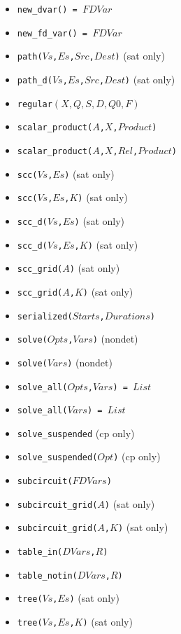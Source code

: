 \documentclass[10pt]{article}
\begin{document}
\begin{multicols}{2}
\begin{scriptsize}
\begin{itemize}
\item \texttt{new\_dvar() = $FDVar$}
\item \texttt{new\_fd\_var() = $FDVar$}
\item \texttt{path($Vs$,$Es$,$Src$,$Dest$)} (sat only)    
\item \texttt{path\_d($Vs$,$Es$,$Src$,$Dest$)} (sat only)    
\item \texttt{regular$(X,Q,S,D,Q0,F)$}
\item \texttt{scalar\_product($A$,$X$,$Product$)} 
\item \texttt{scalar\_product($A$,$X$,$Rel$,$Product$)}
\item \texttt{scc($Vs$,$Es$)} (sat only) 
\item \texttt{scc($Vs$,$Es$,$K$)} (sat only)
\item \texttt{scc\_d($Vs$,$Es$)} (sat only) 
\item \texttt{scc\_d($Vs$,$Es$,$K$)} (sat only)
\item \texttt{scc\_grid($A$)} (sat only) 
\item \texttt{scc\_grid($A$,$K$)} (sat only) 
\item \texttt{serialized($Starts$,$Durations$)}
\item \texttt{solve($Opts$,$Vars$)} (nondet)
\item \texttt{solve($Vars$)} (nondet)
\item \texttt{solve\_all($Opts$,$Vars$) = $List$}
\item \texttt{solve\_all($Vars$) = $List$}
\item \texttt{solve\_suspended} (cp only)
\item \texttt{solve\_suspended($Opt$)} (cp only)
\item \texttt{subcircuit($FDVars$)}
\item \texttt{subcircuit\_grid($A$)} (sat only)
\item \texttt{subcircuit\_grid($A$,$K$)} (sat only) 
\item \texttt{table\_in($DVars$,$R$)}
\item \texttt{table\_notin($DVars$,$R$)}
\item \texttt{tree($Vs$,$Es$)} (sat only) 
\item \texttt{tree($Vs$,$Es$,$K$)} (sat only)
\end{itemize}
\end{scriptsize}

\end{multicols}
\end{document}
